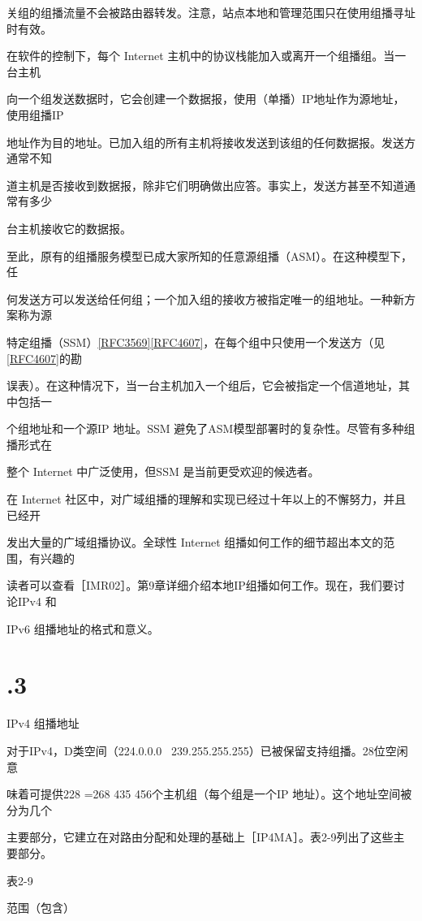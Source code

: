 关组的组播流量不会被路由器转发。注意，站点本地和管理范围只在使用组播寻址时有效。

在软件的控制下，每个 Internet 主机中的协议栈能加入或离开一个组播组。当一台主机

向一个组发送数据时，它会创建一个数据报，使用（单播）IP地址作为源地址，使用组播IP

地址作为目的地址。已加入组的所有主机将接收发送到该组的任何数据报。发送方通常不知

道主机是否接收到数据报，除非它们明确做出应答。事实上，发送方甚至不知道通常有多少

台主机接收它的数据报。

至此，原有的组播服务模型已成大家所知的任意源组播（ASM）。在这种模型下，任

何发送方可以发送给任何组；一个加入组的接收方被指定唯一的组地址。一种新方案称为源

特定组播（SSM）\href{https://www.rfc-editor.org/rfc/rfc3569}{[RFC3569]}\href{https://www.rfc-editor.org/rfc/rfc4607}{[RFC4607]}，在每个组中只使用一个发送方（见\href{https://www.rfc-editor.org/rfc/rfc4607}{[RFC4607]}的勘

误表）。在这种情况下，当一台主机加入一个组后，它会被指定一个信道地址，其中包括一

个组地址和一个源IP 地址。SSM 避免了ASM模型部署时的复杂性。尽管有多种组播形式在

整个 Internet 中广泛使用，但SSM 是当前更受欢迎的候选者。

在 Internet 社区中，对广域组播的理解和实现已经过十年以上的不懈努力，并且已经开

发出大量的广域组播协议。全球性 Internet 组播如何工作的细节超出本文的范围，有兴趣的

读者可以查看［IMR02］。第9章详细介绍本地IP组播如何工作。现在，我们要讨论IPv4 和

IPv6 组播地址的格式和意义。

\section{.3}
IPv4 组播地址

对于IPv4，D类空间（224.0.0.0 ~239.255.255.255）已被保留支持组播。28位空闲意

味着可提供228 =268 435 456个主机组（每个组是一个IP 地址）。这个地址空间被分为几个

主要部分，它建立在对路由分配和处理的基础上［IP4MA］。表2-9列出了这些主要部分。

表2-9

范围（包含）


